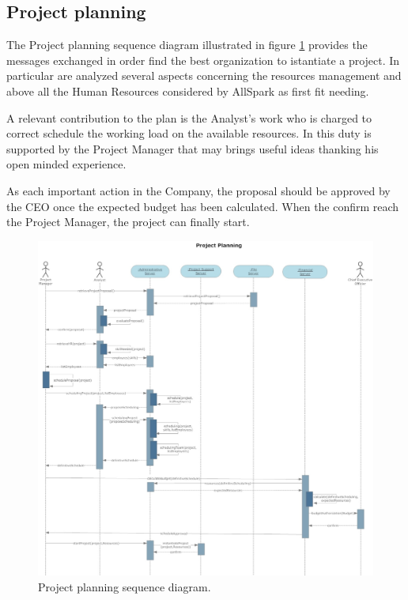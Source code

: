 \subsection{Project planning}
The Project planning sequence diagram illustrated in figure \ref{3img:[sequence]project_planning} provides the messages exchanged in order find the best organization to istantiate a project. In particular are analyzed several aspects concerning the resources management and above all the Human Resources considered by AllSpark as first fit needing.

A relevant contribution to the plan is the Analyst's work who is charged to correct schedule the working load on the available resources. In this duty is supported by the Project Manager that may brings useful ideas thanking his open minded experience.

As each important action in the Company, the proposal should be approved by the CEO once the expected budget has been calculated. When the confirm reach the Project Manager, the project can finally start.

\begin{figure}[H]
\begin{centering}
\includegraphics[scale=0.30,angle=90]{assign3/sdraw/imgs/project_planning.jpg}
\caption{Project planning sequence diagram.}
\label{3img:[sequence]project_planning}
\end{centering}
\end{figure}


